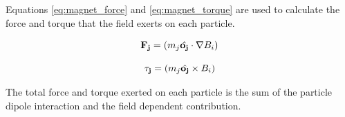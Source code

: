 Equations \ref{eq:magnet_force} and \ref{eq:magnet_torque} are used to calculate the force and torque that the field exerts on each particle.

\begin{equation}
    \mathbf{F_{j}} = (m_j \Hat{\mathbf{o_j}} \cdot \nabla B_i)
    \label{eq:magnet_force}
\end{equation}

\begin{equation}
    \mathbf{\tau_j} = (m_j \Hat{\mathbf{o_j}} \times B_i)
    \label{eq:magnet_torque}
\end{equation}

The total force and torque exerted on each particle is the sum of the particle dipole interaction and the field dependent contribution. 
